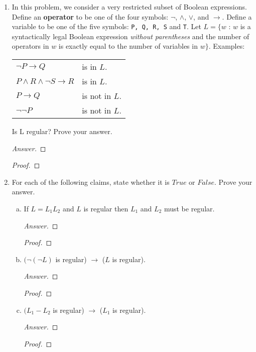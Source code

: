\documentclass[10pt]{article}
\begin{document}
\begin{enumerate}[1)]

\item
In this problem, we consider a very restricted subset of Boolean expressions.  Define an \textbf{operator} to be one of the four symbols: $\lnot$, $\land$, $\lor$, and $\rightarrow$.  Define a variable to be one of the five symbols: \texttt{P, Q, R, S} and \texttt{T}.  Let $L = \{w$ : $w$ is a syntactically legal Boolean expression \textit{without parentheses} and the number of operators in $w$ is exactly equal to the number of variables in $w\}$.  Examples:
\begin{center}
\begin{tabular}{l@{\hspace{1cm}}l}
$\lnot P \rightarrow Q$ &is in $L$.\\
$P \land R \land \lnot S \rightarrow R$ & is in $L$.\\
$P \rightarrow Q$ & is not in $L$.\\
$\lnot \lnot P$ & is not in $L$.
\end{tabular}
\end{center}

Is L regular?  Prove your answer.
\begin{proof}[Answer]
\end{proof}
\begin{proof}[Proof]
\end{proof}


\item
For each of the following claims, state whether it is $True$ or $False$.  Prove your answer.
\begin{enumerate}[a)]
\item
If $L = L_1L_2$ and $L$ is regular then $L_1$ and $L_2$ must be regular.
\begin{proof}[Answer]
\end{proof}
\begin{proof}[Proof]
\end{proof}

\item
$(\lnot (\lnot L)$ is regular) $\rightarrow$ ($L$ is regular).
\begin{proof}[Answer]
\end{proof}
\begin{proof}[Proof]
\end{proof}

\item
$(L_1 - L_2$ is regular) $\rightarrow$ ($L_1$ is regular).
\begin{proof}[Answer]
\end{proof}
\begin{proof}[Proof]
\end{proof}


\end{enumerate}
\end{enumerate}
\end{document}
